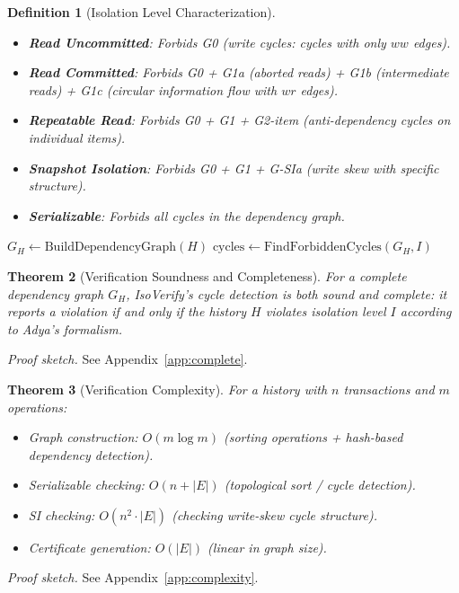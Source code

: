 \documentclass[11pt]{article}
\newtheorem{theorem}{Theorem}
\newtheorem{definition}[theorem]{Definition}
\begin{document}
\begin{definition}[Isolation Level Characterization]
\begin{itemize}
\item \textbf{Read Uncommitted}: Forbids G0 (write cycles: cycles with only
  $ww$ edges).
\item \textbf{Read Committed}: Forbids G0 + G1a (aborted reads) + G1b
  (intermediate reads) + G1c (circular information flow with $wr$ edges).
\item \textbf{Repeatable Read}: Forbids G0 + G1 + G2-item (anti-dependency
  cycles on individual items).
\item \textbf{Snapshot Isolation}: Forbids G0 + G1 + G-SIa (write skew with
  specific structure).
\item \textbf{Serializable}: Forbids all cycles in the dependency graph.
\end{itemize}
\end{definition}

\begin{algorithm}[t]
\SetAlgoLined
{}
$G_H \leftarrow \text{BuildDependencyGraph}(H)$\;
$\text{cycles} \leftarrow \text{FindForbiddenCycles}(G_H, I)$\;
\caption{IsoVerify Verification Algorithm}
\end{algorithm}

\begin{theorem}[Verification Soundness and Completeness]
\label{thm:complete}
For a complete dependency graph $G_H$, IsoVerify's cycle detection is both
sound and complete: it reports a violation if and only if the history $H$
violates isolation level $I$ according to Adya's formalism.
\end{theorem}
\noindent\emph{Proof sketch.}  See Appendix~\ref{app:complete}.

\begin{theorem}[Verification Complexity]
\label{thm:complexity}
For a history with $n$ transactions and $m$ operations:
\begin{itemize}
\item Graph construction: $O(m \log m)$ (sorting operations + hash-based
  dependency detection).
\item Serializable checking: $O(n + |E|)$ (topological sort / cycle
  detection).
\item SI checking: $O(n^2 \cdot |E|)$ (checking write-skew cycle structure).
\item Certificate generation: $O(|E|)$ (linear in graph size).
\end{itemize}
\end{theorem}
\noindent\emph{Proof sketch.}  See Appendix~\ref{app:complexity}.
\end{document}
